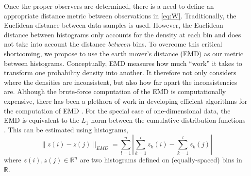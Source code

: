 \documentclass[prl, reprint, final, showkeys]{revtex4-1}
\begin{document}
Once the proper observers are determined, there is a need to define an appropriate distance metric between observations in \eqref{eq:W}.
%
Traditionally, the Euclidean distance between data samples is used.
%
However, the Euclidean distance between histograms only accounts for the density at each bin and does not take into account the distance {\em between} bins.
%
%
%
To overcome this critical shortcoming, we propose to use the earth mover's distance (EMD) \cite{rubner2000earth} as our metric between histograms.
%
Conceptually, EMD measures how much ``work'' it takes to transform one probability density into another.
%
It therefore not only considers where the densities are inconsistent, but also how far apart the inconsistencies are.
%
Although the brute-force computation of the EMD is computationally expensive, there has been a plethora of work in developing efficient algorithms for the computation of EMD \cite{Pele-eccv2008, Pele-iccv2009}.
%
%
%
For the special case of one-dimensional data, the EMD is equivalent to the $L_1$-norm between the cumulative distribution functions \cite{rubner2000perceptual}.
%
This can be estimated using histograms, 
\begin{equation}
\| z(i) - z(j) \|_{EMD} = \sum_{l=1}^{n} \left| \sum_{k=1}^l z_k(i) - \sum_{k=1}^l z_k(j) \right|
\end{equation}
where $z(i), z(j) \in \mathbb{R}^n$ are two histograms defined on (equally-spaced) bins in $\mathbb{R}$. 
\end{document}
